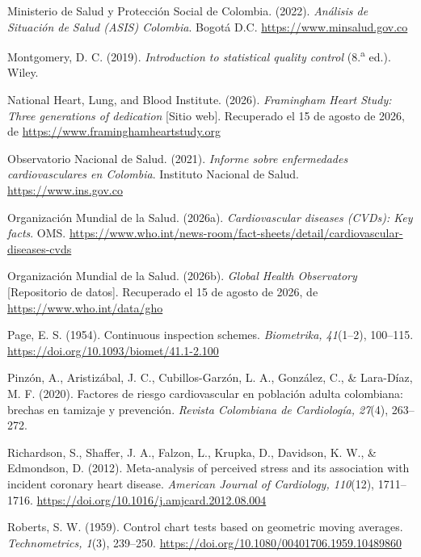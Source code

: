 \documentclass[12pt,letterpaper]{article}
\begin{document}
\begin{enumerate}[label={[\arabic*]}, leftmargin=2.2em]
\item Ministerio de Salud y Protección Social de Colombia. (2022).
\textit{Análisis de Situación de Salud (ASIS) Colombia}. Bogotá D.C.
\url{https://www.minsalud.gov.co}

\item Montgomery, D. C. (2019). \textit{Introduction to statistical quality
control} (8.\textsuperscript{a} ed.). Wiley.

\item National Heart, Lung, and Blood Institute. (2026). \textit{Framingham
Heart Study: Three generations of dedication} [Sitio web]. Recuperado el 15 de
agosto de 2026, de \url{https://www.framinghamheartstudy.org}

\item Observatorio Nacional de Salud. (2021). \textit{Informe sobre enfermedades
cardiovasculares en Colombia}. Instituto Nacional de Salud.
\url{https://www.ins.gov.co}

\item Organización Mundial de la Salud. (2026a). \textit{Cardiovascular diseases
(CVDs): Key facts}. OMS.
\url{https://www.who.int/news-room/fact-sheets/detail/cardiovascular-diseases-cvds}

\item Organización Mundial de la Salud. (2026b). \textit{Global Health
Observatory} [Repositorio de datos]. Recuperado el 15 de agosto de 2026, de
\url{https://www.who.int/data/gho}

\item Page, E. S. (1954). Continuous inspection schemes. \textit{Biometrika,
41}(1--2), 100--115. \url{https://doi.org/10.1093/biomet/41.1-2.100}

\item Pinzón, A., Aristizábal, J. C., Cubillos-Garzón, L. A., González, C., \&
Lara-Díaz, M. F. (2020). Factores de riesgo cardiovascular en población adulta
colombiana: brechas en tamizaje y prevención. \textit{Revista Colombiana de
Cardiología, 27}(4), 263--272.

\item Richardson, S., Shaffer, J. A., Falzon, L., Krupka, D., Davidson, K. W.,
\& Edmondson, D. (2012). Meta-analysis of perceived stress and its association
with incident coronary heart disease. \textit{American Journal of Cardiology,
110}(12), 1711--1716. \url{https://doi.org/10.1016/j.amjcard.2012.08.004}

\item Roberts, S. W. (1959). Control chart tests based on geometric moving
averages. \textit{Technometrics, 1}(3), 239--250.
\url{https://doi.org/10.1080/00401706.1959.10489860}


\end{enumerate}
\end{document}
